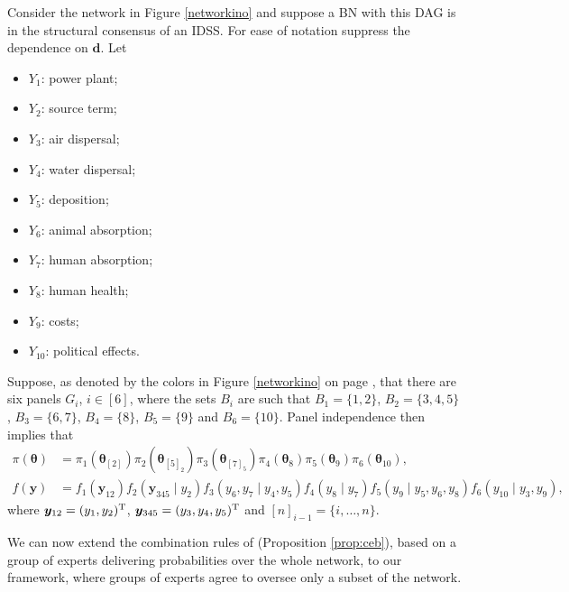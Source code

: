 \begin{example}
Consider the network in Figure \ref{networkino} and suppose a BN with this DAG is in the structural consensus of an IDSS. For ease of notation suppress the dependence on $\bm{d}$. Let
\begin{multicols}{2}
\begin{itemize}
\item $Y_1$: power plant;
\item $Y_2$: source term;
\item $Y_3$: air dispersal;
\item $Y_4$: water dispersal;
\item $Y_5$: deposition;
\item $Y_6$: animal absorption;
\item $Y_7$: human absorption;
\item $Y_8$: human health;
\item $Y_{9}$: costs;
\item $Y_{10}$: political effects.
\end{itemize}
\end{multicols}
Suppose, as denoted by the colors in Figure \ref{networkino} on page \pageref{networkino}, that there are six panels $G_i$, $i\in[6]$, where the sets $B_i$ are such that $B_1=\{1,2\}$, $B_2=\{3,4,5\}$, $B_3=\{6,7\}$, $B_4=\{8\}$, $B_5=\{9\}$ and $B_6=\{10\}$. Panel independence then implies that
\begin{align*}
\pi(\bm{\theta})&=\pi_1(\bm{\theta}_{[2]})\pi_2(\bm{\theta}_{[5]_2})\pi_3(\bm{\theta}_{[7]_5})\pi_4(\bm{\theta}_{8})\pi_5(\bm{\theta}_{9})\pi_6(\bm{\theta}_{10}),\\
f(\bm{y})&=f_1(\bm{y}_{12})f_2(\bm{y}_{345}\;|\;y_2)f_3(y_6,y_7\;|\;y_4,y_5)f_4(y_8\;|\;y_7)f_5(y_9\;|\;y_5,y_6,y_8)f_6(y_{10}\;|\;y_3,y_9),
\end{align*}
where $\bm{y}_{12}=(y_1,y_2)^{\textnormal{T}}$, $\bm{y}_{345}=(y_3,y_4,y_5)^{\textnormal{T}}$ and $[n]_{i-1}=\{i,\dots, n\}$.
\end{example}

We can now extend the combination rules of \citet{Faria1997} (Proposition \ref{prop:ceb}), based on a group of experts delivering probabilities over the whole network, to our framework, where groups of experts agree to oversee only a subset of the network.


